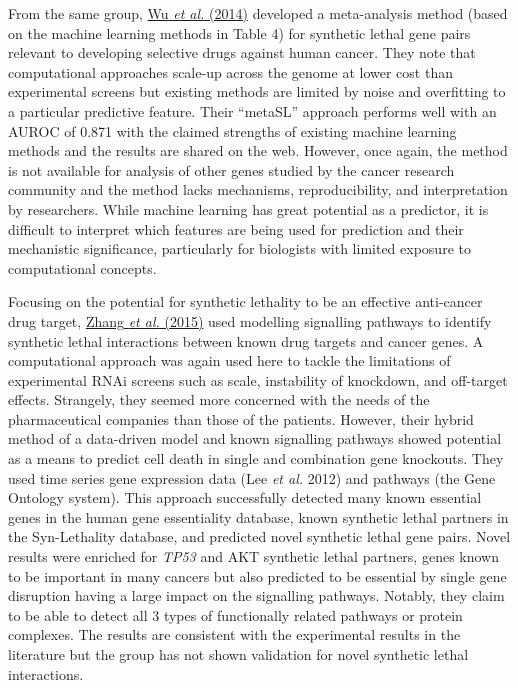 From the same group, \hyperlink{ENREF114}{Wu}\hyperlink{ENREF114}{\textit{ et al.}}\hyperlink{ENREF114}{ (2014)} developed a meta-analysis method (based on the machine learning methods in Table 4) for synthetic lethal gene pairs relevant to developing selective drugs against human cancer. They note that computational approaches scale-up across the genome at lower cost than experimental screens but existing methods are limited by noise and overfitting to a particular predictive feature. Their {\textquotedblleft}metaSL{\textquotedblright} approach performs well with an AUROC of 0.871 with the claimed strengths of existing machine learning methods and the results are shared on the web. However, once again, the method is not available for analysis of other genes studied by the cancer research community and the method lacks mechanisms, reproducibility, and interpretation by researchers. While machine learning has great potential as a predictor, it is difficult to interpret which features are being used for prediction and their mechanistic significance, particularly for biologists with limited exposure to computational concepts.  

Focusing on the potential for synthetic lethality to be an effective anti-cancer drug target, \hyperlink{ENREF117}{Zhang}\hyperlink{ENREF117}{\textit{ et al.}}\hyperlink{ENREF117}{ (2015)} used modelling signalling pathways to identify synthetic lethal interactions between known drug targets and cancer genes. A computational approach was again used here to tackle the limitations of experimental RNAi screens such as scale, instability of knockdown, and off-target effects. Strangely, they seemed more concerned with the needs of the pharmaceutical companies than those of the patients. However, their {\textquotesingle}hybrid{\textquotesingle} method of a data-driven model and known signalling pathways showed potential as a means to predict cell death in single and combination gene knockouts. They used time series gene expression data (Lee\textit{ et al.} 2012) and pathways (the Gene Ontology system). This approach successfully detected many known essential genes in the human gene essentiality database, known synthetic lethal partners in the Syn-Lethality database, and predicted novel synthetic lethal gene pairs. Novel results were enriched for \textit{TP53} and AKT synthetic lethal partners, genes known to be important in many cancers but also predicted to be essential by single gene disruption having a large impact on the signalling pathways. Notably, they claim to be able to detect all 3 types of functionally related pathways or protein complexes. The results are consistent with the experimental results in the literature but the group has not shown validation for novel synthetic lethal interactions.  

